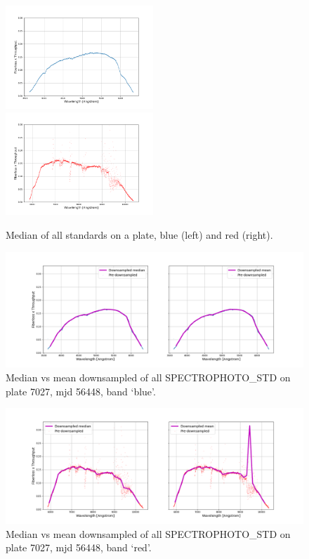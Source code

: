 \begin{figure}[h]
    \centering
    \includegraphics[width=0.495\textwidth]{images/specsim/all_stds_median_7027_56448_blue.png}
    \includegraphics[width=0.495\textwidth]{images/specsim/all_stds_median_7027_56448_red.png}
    \caption{Median of all standards on a plate, blue (left) and red (right).}
    \label{fig:all_stds_median}
\end{figure}

\begin{figure}[h]
\centering
\includegraphics[width=20cm]{images/specsim/downsampled_7027_56448_blue.png}
\caption{Median vs mean downsampled of all SPECTROPHOTO\_STD on plate 7027, mjd 56448, band `blue'.}
\label{fig:downsampled_blue}
\end{figure}


\begin{figure}[h]
\centering
\includegraphics[width=20cm]{images/specsim/downsampled_7027_56448_red.png}
\caption{Median vs mean downsampled of all SPECTROPHOTO\_STD on plate 7027, mjd 56448, band `red'.}
\label{fig:downsampled_red}
\end{figure}

